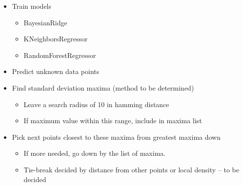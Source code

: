 \documentclass{article}
\begin{document}
\begin{itemize}
    \item Train models
    \begin{itemize}
        \item BayesianRidge
        \item KNeighborsRegressor
        \item RandomForestRegressor
    \end{itemize}
    \item Predict unknown data points
    \item Find standard deviation maxima (method to be determined)
    \begin{itemize}
        \item Leave a search radius of 10 in hamming distance
        \item If maximum value within this range, include in maxima list
    \end{itemize}
    \item Pick next points closest to these maxima from greatest maxima down
    \begin{itemize}
        \item If more needed, go down by the list of maxima.
        \item Tie-break decided by distance from other points or local density -- to be decided
    \end{itemize} 
\end{itemize}
\end{document}
